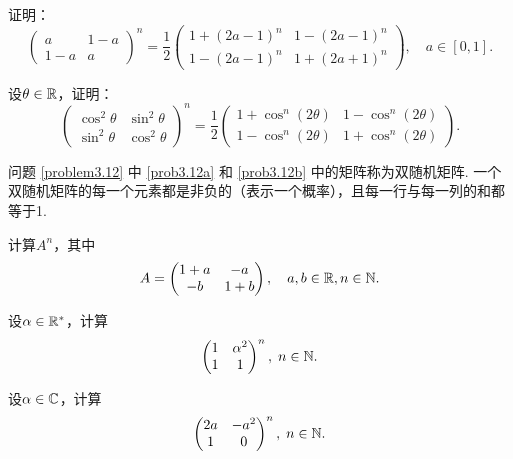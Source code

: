\begin{problem}[双随机矩阵.]
  \begin{enum}
    \item\label{prob3.12a} 证明：
    \[
      \begin{pmatrix}
        a & 1 - a\\
        1 - a & a
      \end{pmatrix}^n = \frac12
      \begin{pmatrix}
        1 + (2a - 1)^n & 1 - (2a - 1)^n \\
        1 - (2a - 1)^n & 1 + (2a + 1)^n
      \end{pmatrix},\quad a\in[0,1].
    \]
    \item\label{prob3.12b} 设$\theta\in\mathbb R$，证明：
    \[
      \begin{pmatrix}
        \cos^2\theta & \sin^2\theta \\
        \sin^2\theta & \cos^2\theta
      \end{pmatrix}^n = \frac12
      \begin{pmatrix}
        1 + \cos^n(2\theta) & 1 - \cos^n(2\theta) \\
        1 - \cos^n(2\theta) & 1 + \cos^n(2\theta)
      \end{pmatrix}.
    \]
  \end{enum}
  \begin{remark}
    问题 \ref{problem3.12} 中 \ref{prob3.12a} 和 \ref{prob3.12b} 中的矩阵称为{\kaishu 双随机矩阵}. 一个双随机矩阵的每一个元素都是非负的（表示一个概率），且每一行与每一列的和都等于1.
  \end{remark}
\end{problem}

\begin{problem}
  计算$A^n$，其中
  \[
    A = \begin{pmatrix}
      1 + a & - a \\
      -b & 1 + b
    \end{pmatrix},\quad a,b\in\mathbb R,n\in\mathbb N.
  \]
\end{problem}

\begin{problem}
  设$\alpha\in\mathbb R^\ast$，计算
  \[
    \begin{pmatrix}
      1 & \alpha^2 \\
      1 & 1
    \end{pmatrix}^n,\; n\in\mathbb N.
  \]
\end{problem}

\begin{problem}
  设$\alpha\in\mathbb C$，计算
  \[
    \begin{pmatrix}
      2a & -a^2 \\
      1 & 0
    \end{pmatrix}^n,\; n\in\mathbb N.
  \]
\end{problem}

